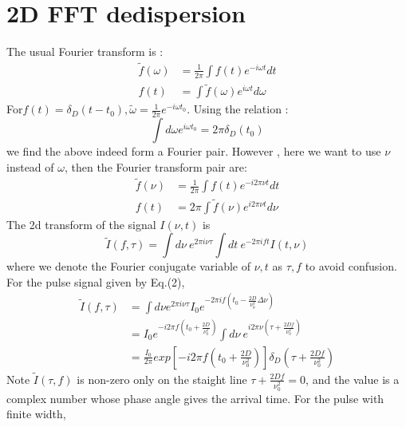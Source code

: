 \documentclass[twocolumn]{aastex61}
\begin{document}
\section{2D FFT dedispersion}
\label{sec:results}
The usual Fourier transform is :
\begin{equation}
\begin{aligned}
\widetilde{f}(\omega) & =\frac{1}{2\pi} \int f(t)e^{-i\omega t}dt \\
 f(t) & = \int \widetilde{f}(\omega)e^{i\omega t}d\omega
 \end{aligned}
\end{equation}
For$ f(t) = \delta _D(t-t_0), \widetilde{\omega} = \frac{1}{2\pi}e^{-i\omega t_0}$. Using the relation :
\begin{equation}
\int d\omega e^{i\omega t_0} = 2\pi \delta _D (t_0)
\end{equation}
we find the above indeed form a Fourier pair. However , here we want to use $\nu$ instead of $\omega$, then the Fourier transform pair are:
\begin{equation}
\begin{aligned}
\widetilde{f} (\nu) &= \frac{1}{2\pi}\int f(t) e^{-i2\pi \nu t}dt \\
f(t) &= 2\pi \int \widetilde{f}(\nu) e^{i2\pi \nu t} d\nu
\end{aligned}
\end{equation}
The 2d transform of the signal $I(\nu,t)$ is 
\begin{equation}
\widetilde{I}(f,\tau)=\int d\nu~e^{2\pi i \nu \tau} \int dt~e^{-2\pi ift}I(t,\nu)
\end{equation}
where we denote the Fourier conjugate variable of $\nu,t$ as $\tau,f$ to avoid confusion. For the pulse signal given by Eq.(2),
\begin{equation}
\begin{aligned}
\widetilde{I}(f,\tau) &= \int d\nu e^{2\pi i\nu \tau}I_0 e^{-2\pi i f(t_0 - \frac{2D}{\nu ^3 _0}\Delta \nu)} \\
								&= I_0 e^{-i2\pi f(t_0 + \frac{2D}{\nu ^2 _0})}\int d\nu~ e^{i2\pi \nu (\tau + \frac{2Df}{\nu ^2 _0})} \\
								&= \frac{I_0}{2\pi}exp[-i2\pi f(t_0 + \frac{2D}{\nu ^2 _0})]\delta
								 _D (\tau + \frac{2Df}{\nu ^2 _0})
\end{aligned}
\end{equation} 
Note $\widetilde{I}(\tau,f)$ is non-zero only on the staight line $\tau + \frac{2Df}{\nu ^2 _0}=0$, and the value is a complex number whose phase angle gives the arrival time. For the pulse with finite width,
\end{document}
